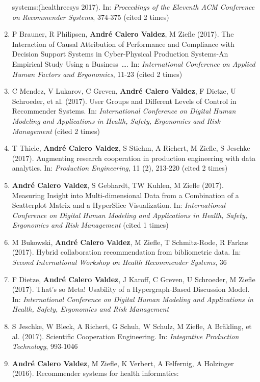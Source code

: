 \documentclass[11pt,a4paper,sans]{moderncv}
\begin{document}
\begin{enumerate}
  systems:(healthrecsys 2017). In: \emph{Proceedings of the Eleventh ACM
  Conference on Recommender Systems}, 374-375 (cited 2 times)
\item
  P Brauner, R Philipsen, \textbf{André Calero Valdez}, M Ziefle (2017).
  The Interaction of Causal Attribution of Performance and Compliance
  with Decision Support Systems in Cyber-Physical Production Systems-An
  Empirical Study Using a Business~\ldots{}. In: \emph{International
  Conference on Applied Human Factors and Ergonomics}, 11-23 (cited 2
  times)
\item
  C Mendez, V Lukarov, C Greven, \textbf{André Calero Valdez}, F Dietze,
  U Schroeder, et al. (2017). User Groups and Different Levels of
  Control in Recommender Systems. In: \emph{International Conference on
  Digital Human Modeling and Applications in Health, Safety, Ergonomics
  and Risk Management} (cited 2 times)
\item
  T Thiele, \textbf{André Calero Valdez}, S Stiehm, A Richert, M Ziefle,
  S Jeschke (2017). Augmenting research cooperation in production
  engineering with data analytics. In: \emph{Production Engineering}, 11
  (2), 213-220 (cited 2 times)
\item
  \textbf{André Calero Valdez}, S Gebhardt, TW Kuhlen, M Ziefle (2017).
  Measuring Insight into Multi-dimensional Data from a Combination of a
  Scatterplot Matrix and a HyperSlice Visualization. In:
  \emph{International Conference on Digital Human Modeling and
  Applications in Health, Safety, Ergonomics and Risk Management} (cited
  1 times)
\item
  M Bukowski, \textbf{André Calero Valdez}, M Ziefle, T Schmitz-Rode, R
  Farkas (2017). Hybrid collaboration recommendation from bibliometric
  data. In: \emph{Second International Workshop on Health Recommender
  Systems}, 36
\item
  F Dietze, \textbf{André Calero Valdez}, J Karoff, C Greven, U
  Schroeder, M Ziefle (2017). That's so Meta! Usability of a
  Hypergraph-Based Discussion Model. In: \emph{International Conference
  on Digital Human Modeling and Applications in Health, Safety,
  Ergonomics and Risk Management}
\item
  S Jeschke, W Bleck, A Richert, G Schuh, W Schulz, M Ziefle, A
  Bräkling, et al. (2017). Scientific Cooperation Engineering. In:
  \emph{Integrative Production Technology}, 993-1046
\item
  \textbf{André Calero Valdez}, M Ziefle, K Verbert, A Felfernig, A
  Holzinger (2016). Recommender systems for health informatics:

\end{enumerate}
\end{document}

